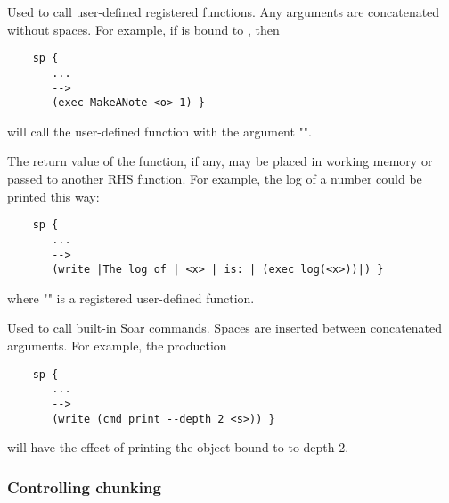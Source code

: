 \begin{description}

\item [\soarb{exec} --- ]
	Used to call user-defined registered functions. Any arguments are concatenated without spaces. For example, if  is bound to , then

	\begin{verbatim}
	sp {
	   ...
	   -->
	   (exec MakeANote <o> 1) }
	\end{verbatim}

	will call the user-defined  function with the argument "".

	The return value of the function, if any, may be placed in working memory or passed to another RHS function. For example, the log of a number  could be printed this way:

	\begin{verbatim}
	sp {
	   ...
	   -->
	   (write |The log of | <x> | is: | (exec log(<x>))|) }
	\end{verbatim}

	where "" is a registered user-defined function.

\item[\soarb{cmd} --- ]
	Used to call built-in Soar commands. Spaces are inserted between concatenated arguments. For example, the production

	\begin{verbatim}
	sp {
	   ...
	   -->
	   (write (cmd print --depth 2 <s>)) }
	\end{verbatim}

	will have the effect of printing the object bound to  to depth 2.

\end{description}


\subsubsection{Controlling chunking}
\label{SYNTAX-pm-rhs-learning}

